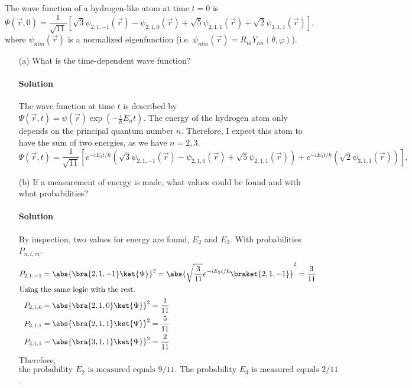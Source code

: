 \documentclass{article}
\numberwithin{equation}{section}
\begin{document}
	The wave function of a hydrogen-like atom at time $t=0$ is
	\begin{equation}
		\Psi(\vec{r},0) = \frac{1}{\sqrt{11}} \left[ \sqrt{3} \psi_{2,1,-1} (\vec{r}) - \psi_{2,1,0} (\vec{r}) + \sqrt{5} \psi_{2,1,1} (\vec{r}) + \sqrt{2} \psi_{3,1,1} (\vec{r}) \right],
	\end{equation}
	where $\psi_{nlm}(\vec{r})$ is a normalized eigenfunction (i.e. $\psi_{nlm}(\vec{r}) = R_{nl} Y_{lm}(\theta,\varphi)$).
	\begin{enumerate}
		\item[(a)] What is the time-dependent wave function?
		\paragraph{Solution} The wave function at time $t$ is described by $\Psi(\vec{r},t) = \psi(\vec{r})\exp(-\frac{i}{\hbar} E_n t)$. The energy of the hydrogen atom only depends on the principal quantum number $n$. Therefore, I expect this atom to have the sum of two energies, as we have $n=2,3$.
		\begin{equation}
            \Psi(\vec{r},t) = \frac{1}{\sqrt{11}} \left[ e^{-iE_2t/\hbar} \left(\sqrt{3} \psi_{2,1,-1} (\vec{r}) - \psi_{2,1,0} (\vec{r}) + \sqrt{5} \psi_{2,1,1} (\vec{r})\right) + e^{-iE_3t/\hbar} \left(\sqrt{2} \psi_{3,1,1} (\vec{r})\right) \right],
        \end{equation}        
        
		\item[(b)] If a measurement of energy is made, what values could be found and with what probabilities?
		\paragraph{Solution} By inspection, two values for energy are found, $E_2$ and $E_3$. With probabilities $P_{n,l,m}$.
        \begin{align}
            P_{2,1,-1} &= \abs{ \bra{2,1,-1} \ket{\Psi} }^2 = \abs{\sqrt{\frac{3}{11}} e^{-iE_2t/\hbar} \braket{2,1,-1}}^2 = \frac{3}{11} \\
            \intertext{Using the same logic with the rest.}
            P_{2,1,0} &= \abs{ \bra{2,1,0} \ket{\Psi} }^2 = \frac{1}{11} \\
            P_{2,1,1} &= \abs{ \bra{2,1,1} \ket{\Psi} }^2 = \frac{5}{11} \\
            P_{3,1,1} &= \abs{ \bra{3,1,1} \ket{\Psi} }^2 = \frac{2}{11} \\
        \end{align}
        Therefore, $\boxed{\text{the probability $E_2$ is measured equals $9/11$. The probability $E_3$ is measured equals $2/11$}}$.
		

\end{enumerate}
\end{document}
